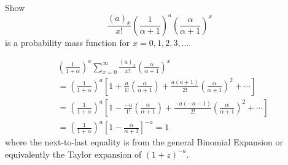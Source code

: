 \documentclass[12pt]{article}
\begin{document}
\begin{exercise}
    Show
    \[
        \frac{(a)_x}{x!}\left( \frac{1}{\alpha+1} \right)^a \left( \frac
        {\alpha}{\alpha+1} \right)^x
    \] is a probability mass function for \( x = 0,1,2,3,\dots \).
\end{exercise}
\begin{solution}
    \begin{align*}
        &\left( \frac{1}{1+\alpha} \right)^a \sum\limits_{x=0}^{\infty}
        \frac{(a)_x}{x!} \left( \frac{\alpha}{\alpha+1} \right)^x \\
        &= \left( \frac{1}{1+\alpha} \right)^a \left[ 1 + \frac{a}{1!}
        \left( \frac{\alpha}{\alpha+1} \right) + \frac{a(a+1)}{2!} \left
        ( \frac{\alpha}{\alpha+1} \right)^2 + \cdots \right] \\
        &= \left( \frac{1}{1+\alpha} \right)^a \left[ 1 - \frac{-a}{1!}
        \left( \frac{\alpha}{\alpha+1} \right) + \frac{-a(-a-1)}{2!}
        \left( \frac{\alpha}{\alpha+1} \right)^2 + \cdots \right] \\
        &= \left( \frac{1}{1+\alpha} \right)^a \left[ 1 - \frac{\alpha}{\alpha+1}
        \right]^{-a} = 1
    \end{align*}
    where the next-to-last equality is from the general Binomial
    Expansion or equivalently the Taylor expansion of \( (1 + z)^{-a} \).
\end{solution}
\end{document}
